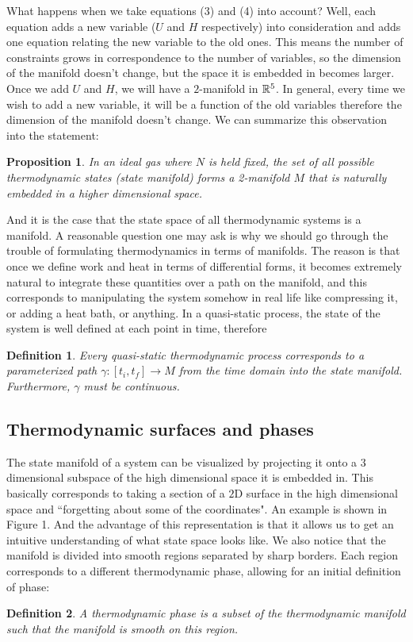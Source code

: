 \documentclass[12pt]{article}
\newtheorem{proposition}{Proposition}
\newtheorem{definition}{Definition}
\begin{document}
What happens when we take equations (3) and (4) into account? Well, each equation adds a new variable ($U$ and $H$ respectively) into consideration and adds one equation relating the new variable to the old ones. This means the number of constraints grows in correspondence to the number of variables, so the dimension of the manifold doesn't change, but the space it is embedded in becomes larger. Once we add $U$ and $H$, we will have a $2$-manifold in $\mathbb{R}^5$. In general, every time we wish to add a new variable, it will be a function of the old variables therefore the dimension of the manifold doesn't change. We can summarize this observation into the statement:
\begin{proposition}
In an ideal gas where $N$ is held fixed, the set of all possible thermodynamic states (state manifold) forms a 2-manifold $M$ that is naturally embedded in a higher dimensional space.
\end{proposition}
And it is the case that the state space of all thermodynamic systems is a manifold. A reasonable question one may ask is why we should go through the trouble of formulating thermodynamics in terms of manifolds. The reason is that once we define work and heat in terms of differential forms, it becomes extremely natural to integrate these quantities over a path on the manifold, and this corresponds to manipulating the system somehow in real life like compressing it, or adding a heat bath, or anything.
In a quasi-static process, the state of the system is well defined at each point in time, therefore
\begin{definition}
Every quasi-static thermodynamic process corresponds to a parameterized path $\gamma: [t_i, t_f] \to M$ from the time domain into the state manifold. Furthermore, $\gamma$ must be continuous.
\end{definition}

\subsection{Thermodynamic surfaces and phases}
The state manifold of a system can be visualized by projecting it onto a $3$ dimensional subspace of the high dimensional space it is embedded in. This basically corresponds to taking a section of a $2$D surface in the high dimensional space and ``forgetting about some of the coordinates". An example is shown in Figure 1.
And the advantage of this representation is that it allows us to get an intuitive understanding of what state space looks like. We also notice that the manifold is divided into smooth regions separated by sharp borders. Each region corresponds to a different thermodynamic phase, allowing for an initial definition of phase:
\begin{definition}
A thermodynamic phase is a subset of the thermodynamic manifold such that the manifold is smooth on this region.
\end{definition}
\end{document}
